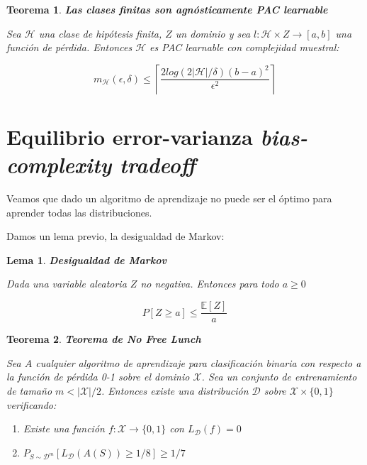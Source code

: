 \documentclass[11pt]{article}
\newtheorem{theorem}{Teorema}
\newtheorem{lemma}{Lema}
\begin{document}
\begin{theorem}
\textbf{Las clases finitas son agnósticamente PAC learnable}

Sea $\mathcal{H}$ una clase de hipótesis finita, $Z$ un dominio y sea $l : \mathcal{H} \times Z \rightarrow [a,b]$ una función de pérdida. Entonces $\mathcal{H}$ es PAC learnable con complejidad muestral:

\[m_{\mathcal{H}}( \epsilon, \delta ) \le \left\lceil \frac{2 log(2|\mathcal{H}|/\delta)(b-a)^2}{\epsilon^2} \right\rceil\]
\end{theorem}

\section{Equilibrio error-varianza \emph{bias-complexity tradeoff}}
\label{sec-5}
Veamos que dado un algoritmo de aprendizaje no puede ser el óptimo para aprender todas las distribuciones.

Damos un lema previo, la desigualdad de Markov:

\begin{lemma}
\textbf{Desigualdad de Markov}

Dada una variable aleatoria $Z$ no negativa. Entonces para todo $a\ge 0$

\[P[Z \ge a] \le \frac{\mathbb{E}[Z]}{a}\]
\end{lemma}

\begin{theorem}
\textbf{Teorema de No Free Lunch}

Sea $A$ cualquier algoritmo de aprendizaje para clasificación binaria con respecto a la función de pérdida 0-1 sobre el dominio $\mathcal{X}$. Sea un conjunto de entrenamiento de tamaño $m < |\mathcal{X}|/2$. Entonces existe una distribución $\mathcal{D}$ sobre $\mathcal{X} \times \{0,1\}$ verificando:

\begin{enumerate}
\item Existe una función $f: \mathcal{X} \rightarrow \{0,1\}$ con $L_{\mathcal{D}}(f)=0$
\item $P_{S\sim \mathcal{D}^m} [L_{\mathcal{D}} (A(S)) \ge 1/8] \ge 1/7$
\end{enumerate}
\end{theorem}
\end{document}
